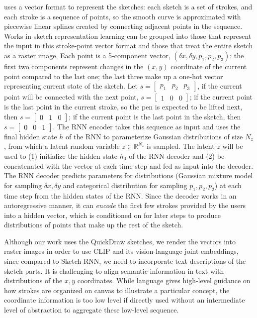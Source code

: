 \cite{ha2017neural} uses a vector format to represent the sketches: each sketch is a set of strokes, and each stroke is a sequence of points, so the smooth curve is approximated with piecewise linear splines created by connecting adjacent points in the sequence. 
Works in sketch representation learning can be grouped into those that represent the input in this stroke-point vector format and those that treat the entire sketch as a raster image. 
Each point is a 5-component vector, $(\delta x, \delta y, p_1, p_2, p_3)$: the first two components represent changes in the $(x,y)$ coordinate of the current point compared to the last one; the last three make up a one-hot vector representing current state of the sketch. Let $s = \begin{bmatrix}p_1 & p_2 & p_3\end{bmatrix}$, if the current point will be connected with the next point, $s = \begin{bmatrix}1 & 0 & 0\end{bmatrix}$;
if the current point is the last point in the current stroke, so the pen is expected to be lifted next, then $s = \begin{bmatrix}0 & 1 & 0\end{bmatrix}$;
if the current point is the last point in the sketch, then $s = \begin{bmatrix}0 & 0 & 1\end{bmatrix}$.     
The RNN encoder takes this sequence as input and uses the final hidden state $h$ of the RNN to parameterize Gaussian distributions of size $N_z$, from which a latent random variable $z \in \mathbb{R}^{N_z}$ is sampled. 
The latent $z$ will be used to (1) initialize the hidden state $h_0$ of the RNN decoder and (2) be concatenated with the vector at each time step and fed as input into the decoder.  
The RNN decoder predicts parameters for distributions (Gaussian mixture model for sampling $\delta x, \delta y$ and categorical distribution for sampling $p_1,p_2,p_2$) at each time step from the hidden states of the RNN. 
Since the decoder works in an autoregressive manner, it can \textit{encode} the first few strokes provided by the users into a hidden vector, which is conditioned on for later steps to produce distributions of points that make up the rest of the sketch. 

Although our work uses the QuickDraw sketches, we render the vectors into raster images in order to use CLIP and its vision-language joint embeddings, since compared to Sketch-RNN, we need to incorporate text descriptions of the sketch parts.
It is challenging to align semantic information in text with distributions of the $x,y$ coordinates. While language gives high-level guidance on how strokes are organized on canvas to illustrate a particular concept, the coordinate information is too low level if directly used without an intermediate level of abstraction to aggregate these low-level sequence.    


